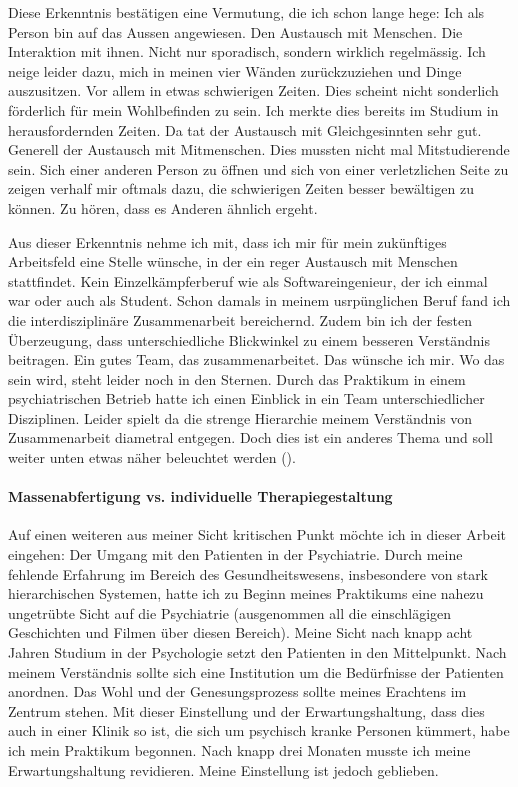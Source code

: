 Diese Erkenntnis bestätigen eine Vermutung, die ich schon lange hege: Ich als Person bin auf das Aussen angewiesen. Den Austausch mit Menschen. Die Interaktion mit ihnen. Nicht nur sporadisch, sondern wirklich regelmässig. Ich neige leider dazu, mich in meinen vier Wänden zurückzuziehen und Dinge auszusitzen. Vor allem in etwas schwierigen Zeiten. Dies scheint nicht sonderlich förderlich für mein Wohlbefinden zu sein. Ich merkte dies bereits im Studium in herausfordernden Zeiten. Da tat der Austausch mit Gleichgesinnten sehr gut. Generell der Austausch mit Mitmenschen. Dies mussten nicht mal Mitstudierende sein. Sich einer anderen Person zu öffnen und sich von einer verletzlichen Seite zu zeigen verhalf mir oftmals dazu, die schwierigen Zeiten besser bewältigen zu können. Zu hören, dass es Anderen ähnlich ergeht. 

Aus dieser Erkenntnis nehme ich mit, dass ich mir für mein zukünftiges Arbeitsfeld eine Stelle wünsche, in der ein reger Austausch mit Menschen stattfindet. Kein Einzelkämpferberuf wie als Softwareingenieur, der ich einmal war oder auch als Student. Schon damals in meinem usrpünglichen Beruf fand ich die interdisziplinäre Zusammenarbeit bereichernd. Zudem bin ich der festen Überzeugung, dass unterschiedliche Blickwinkel zu einem besseren Verständnis beitragen. Ein gutes Team, das zusammenarbeitet. Das wünsche ich mir. Wo das sein wird, steht leider noch in den Sternen. Durch das Praktikum in einem psychiatrischen Betrieb hatte ich einen Einblick in ein Team unterschiedlicher Disziplinen. Leider spielt da die strenge Hierarchie meinem Verständnis von Zusammenarbeit diametral entgegen. Doch dies ist ein anderes Thema und soll weiter unten etwas näher beleuchtet werden ().

\paragraph{Massenabfertigung vs. individuelle Therapiegestaltung}
Auf einen weiteren aus meiner Sicht kritischen Punkt möchte ich in dieser Arbeit eingehen: Der Umgang mit den Patienten in der Psychiatrie. Durch meine fehlende Erfahrung im Bereich des Gesundheitswesens, insbesondere von stark hierarchischen Systemen, hatte ich zu Beginn meines Praktikums eine nahezu ungetrübte Sicht auf die Psychiatrie (ausgenommen all die einschlägigen Geschichten und Filmen über diesen Bereich). Meine Sicht nach knapp acht Jahren Studium in der Psychologie setzt den Patienten in den Mittelpunkt. Nach meinem Verständnis sollte sich eine Institution um die Bedürfnisse der Patienten anordnen. Das Wohl und der Genesungsprozess sollte meines Erachtens im Zentrum stehen. Mit dieser Einstellung und der Erwartungshaltung, dass dies auch in einer Klinik so ist, die sich um psychisch kranke Personen kümmert, habe ich mein Praktikum begonnen. Nach knapp drei Monaten musste ich meine Erwartungshaltung revidieren. Meine Einstellung ist jedoch geblieben. 

